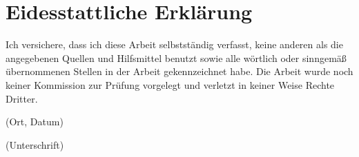 \clearpage
{}
\chapter*{Eidesstattliche Erklärung}

Ich versichere, dass ich diese Arbeit selbstständig verfasst, keine anderen als die angegebenen Quellen und Hilfsmittel benutzt sowie alle wörtlich oder sinngemäß übernommenen Stellen in der Arbeit gekennzeichnet habe.
Die Arbeit wurde noch keiner Kommission zur Prüfung vorgelegt und verletzt in keiner Weise Rechte Dritter.

\begin{multicols}{2}
\underline{\hspace{5cm}}

(Ort, Datum)

\underline{\hspace{5cm}}

(Unterschrift)
\end{multicols}
